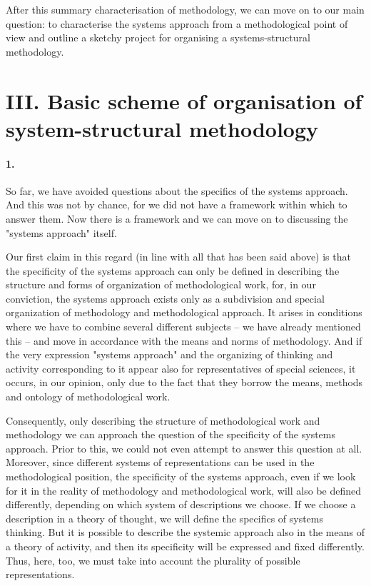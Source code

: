 \documentclass[11pt,a4paper]{article}
\begin{document}
After this summary characterisation of methodology, we can move on to our main
question: to characterise the systems approach from a methodological point of
view and outline a sketchy project for organising a systems-structural
methodology. 

\section*{III. Basic scheme of organisation of system-structural methodology}

\paragraph{1.}
So far, we have avoided questions about the specifics of the systems approach.
And this was not by chance, for we did not have a framework within which to
answer them. Now there is a framework and we can move on to discussing the
"systems approach" itself.

Our first claim in this regard (in line with all that has been said above) is
that the specificity of the systems approach can only be defined in describing
the structure and forms of organization of methodological work, for, in our
conviction, the systems approach exists only as a subdivision and special
organization of methodology and methodological approach. It arises in
conditions where we have to combine several different subjects – we have
already mentioned this – and move in accordance with the means and norms of
methodology. And if the very expression "systems approach" and the organizing
of thinking and activity corresponding to it appear also for representatives
of special sciences, it occurs, in our opinion, only due to the fact that they
borrow the means, methods and ontology of methodological work.

Consequently, only describing the structure of methodological work and
methodology we can approach the question of the specificity of the systems
approach. Prior to this, we could not even attempt to answer this question at
all. Moreover, since different systems of representations can be used in the
methodological position, the specificity of the systems approach, even if we
look for it in the reality of methodology and methodological work, will also
be defined differently, depending on which system of descriptions we choose.
If we choose a description in a theory of thought, we will define the
specifics of systems thinking. But it is possible to describe the systemic
approach also in the means of a theory of activity, and then its specificity
will be expressed and fixed differently. Thus, here, too, we must take into
account the plurality of possible representations.
\end{document}
